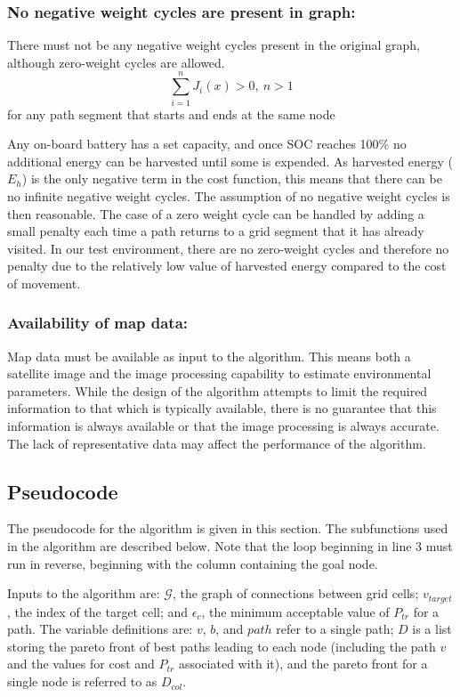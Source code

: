 \documentclass[journal]{IEEEtran}
\begin{document}
\subsubsection{No negative weight cycles are present in graph:}
There must not be any negative weight cycles present in the original graph, although zero-weight cycles are allowed.
\begin{equation}
\sum_{i=1}^n J_i(x) > 0,\ n>1
\end{equation}
for any path segment that starts and ends at the same node

Any on-board battery has a set capacity, and once SOC reaches 100\% no additional energy can be harvested until some is expended. 
As harvested energy ($E_h$) is the only negative term in the cost function, this means that there can be no infinite negative weight cycles. 
The assumption of no negative weight cycles is then reasonable. 
The case of a zero weight cycle can be handled by adding a small penalty each time a path returns to a grid segment that it has already visited.
In our test environment, there are no zero-weight cycles and therefore no penalty due to the relatively low value of harvested energy compared to the cost of movement.

\subsubsection{Availability of map data:}
Map data must be available as input to the algorithm. 
This means both a satellite image and the image processing capability to estimate environmental parameters. 
While the design of the algorithm attempts to limit the required information to that which is typically available, there is no guarantee that this information is always available or that the image processing is always accurate. The lack of representative data may affect the performance of the algorithm.

\subsection{Pseudocode}
The pseudocode for the algorithm is given in this section. The subfunctions used in the algorithm are described below. 
Note that the loop beginning in line 3 must run in reverse, beginning with the column containing the goal node.

Inputs to the algorithm are: $\mathcal{G}$, the graph of connections between grid cells; $v_{target}$, the index of the target cell; and $\epsilon_c$, the minimum acceptable value of $P_{tr}$ for a path. The variable definitions are: $v$, $b$, and $path$ refer to a single path; $D$ is a list storing the pareto front of best paths leading to each node (including the path $v$ and the values for cost and $P_{tr}$ associated with it), and the pareto front for a single node is referred to as $D_{col}$.
\bigskip
\end{document}
